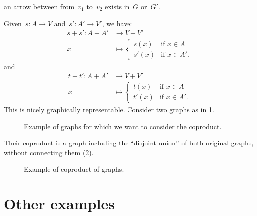 \begin{example}
\begin{compactitem}
\item an arrow between from~$v_1$ to~$v_2$ exists in~$G$ or~$G'$.
\end{compactitem}
Given~$s\colon A\to V$ and~$s'\colon A'\to V'$, we have:
\begin{equation*}
        \begin{aligned}
            s+ s'\colon A+ A'&\to V+ V'\\
            x&\mapsto
                \begin{cases}
                   s(x)& \text{if } x\in A\\
                    s'(x)&\text{if } x\in A'.
                    \end{cases}
        \end{aligned}
        \end{equation*}
and
\begin{equation*}
        \begin{aligned}
            t+t'\colon A+ A'&\to V+ V'\\
            x&\mapsto
                \begin{cases}
                   t(x)& \text{if } x\in A\\
                    t'(x)&\text{if } x\in A'.
                    \end{cases}
        \end{aligned}
\end{equation*}
This is nicely graphically representable. Consider two graphs as in \cref{fig:graphs_1}.

\begin{figure}[h!]
    \centering
    \caption{Example of graphs for which we want to consider the coproduct. \label{fig:graphs_1}}
\end{figure}

Their coproduct is a graph including the ``disjoint union'' of both original graphs, without connecting them (\cref{fig:graphs_2}).



\begin{figure}[h!]
    \centering
    \caption{Example of coproduct of graphs. \label{fig:graphs_2}}
\end{figure}

\end{example}


\section{Other examples}
